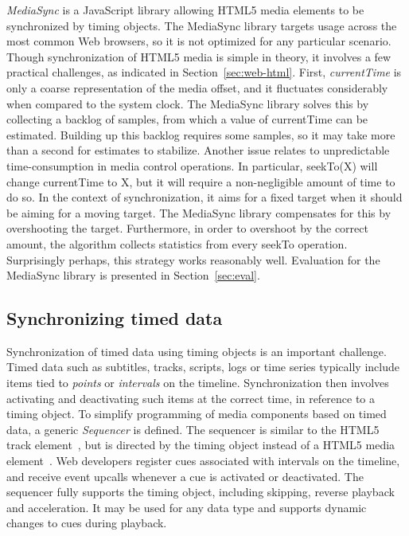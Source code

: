 \emph{MediaSync} is a JavaScript library allowing HTML5 media elements to be
synchronized by timing objects. The MediaSync library targets usage across the
most common Web browsers, so it is not optimized for any particular scenario.
Though synchronization of HTML5 media is simple in theory, it involves a few
practical challenges, as indicated in Section~\ref{sec:web-html}. First,
\emph{currentTime} is only a coarse representation of the media offset, and it
fluctuates considerably when compared to the system clock. The MediaSync
library solves this by collecting a backlog of samples, from which a value of
currentTime can be estimated. Building up this backlog requires some samples,
so it may take more than a second for estimates to stabilize. Another issue
relates to unpredictable time-consumption in media control operations. In
particular, seekTo(X) will change currentTime to X, but it will require a non-negligible 
amount of time to do so. In the context of synchronization, it aims
for a fixed target when it should be aiming for a moving target. The MediaSync
library compensates for this by overshooting the target. Furthermore, in order
to overshoot by the correct amount, the algorithm collects statistics from
every seekTo operation. Surprisingly perhaps, this strategy works reasonably
well. Evaluation for the MediaSync library is presented in Section~\ref{sec:eval}.


\subsection{Synchronizing timed data}
\label{sec:sequencer}

Synchronization of timed data using timing objects is an important challenge.
Timed data such as subtitles, tracks, scripts, logs or time series typically
include items tied to \emph{points} or \emph{intervals} on the timeline.
Synchronization then involves activating and deactivating such items at the
correct time, in reference to a timing object. To simplify programming of
media components based on timed data, a generic \emph{Sequencer} is defined.
The sequencer is similar to the HTML5 track element~\cite{html5track}, but is
directed by the timing object instead of a HTML5 media
element~\cite{html5media}. Web developers register cues associated with
intervals on the timeline, and receive event upcalls whenever a cue is
activated or deactivated. The sequencer fully supports the timing object,
including skipping, reverse playback and acceleration. It may be used for any
data type and supports dynamic changes to cues during playback.

